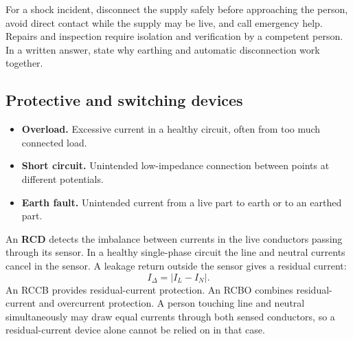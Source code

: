 \documentclass[12pt,a4paper]{article}
\begin{document}
\begin{tcolorbox}[tikzbox,title={Protective roles in a single-phase circuit},unbreakable]
\centering
{}
\end{tcolorbox}

For a shock incident, disconnect the supply safely before approaching the person, avoid direct contact while the supply may be live, and call emergency help. Repairs and inspection require isolation and verification by a competent person. In a written answer, state why earthing and automatic disconnection work together.

\subsection{Protective and switching devices}

\begin{itemize}[leftmargin=*, itemsep=3pt, topsep=4pt]
  \item \textbf{Overload.} Excessive current in a healthy circuit, often from too much connected load.
  \item \textbf{Short circuit.} Unintended low-impedance connection between points at different potentials.
  \item \textbf{Earth fault.} Unintended current from a live part to earth or to an earthed part.
\end{itemize}

An \textbf{RCD} detects the imbalance between currents in the live conductors passing through its sensor. In a healthy single-phase circuit the line and neutral currents cancel in the sensor. A leakage return outside the sensor gives a residual current:
\[
I_{\Delta}=\lvert I_L-I_N\rvert .
\]
An RCCB provides residual-current protection. An RCBO combines residual-current and overcurrent protection. A person touching line and neutral simultaneously may draw equal currents through both sensed conductors, so a residual-current device alone cannot be relied on in that case.
\end{document}
